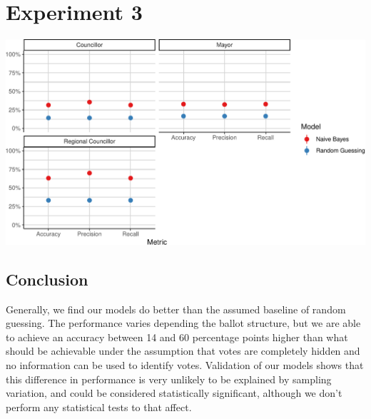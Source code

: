 \documentclass[
]{article}
\begin{document}
\hypertarget{experiment-3}{%
\section{Experiment 3}\label{experiment-3}}

\begin{center}\includegraphics{Untitled_files/figure-latex/unnamed-chunk-1-1} \end{center}

\hypertarget{conclusion}{%
\subsection{Conclusion}\label{conclusion}}

Generally, we find our models do better than the assumed baseline of
random guessing. The performance varies depending the ballot structure,
but we are able to achieve an accuracy between 14 and 60 percentage
points higher than what should be achievable under the assumption that
votes are completely hidden and no information can be used to identify
votes. Validation of our models shows that this difference in
performance is very unlikely to be explained by sampling variation, and
could be considered statistically significant, although we don't perform
any statistical tests to that affect.
\end{document}
